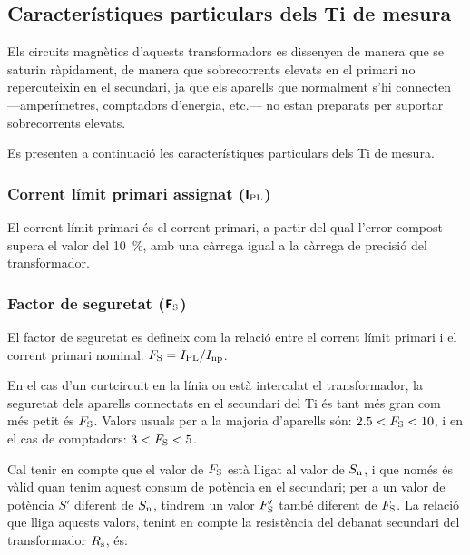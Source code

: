 \subsection{Característiques particulars dels Ti de mesura}

Els circuits magnètics d'aquests transformadors es dissenyen de
manera que se saturin ràpidament, de manera que
sobrecorrents elevats en el primari  no repercuteixin en el secundari,
ja que els aparells que normalment s'hi connecten ---amperímetres,
comptadors d'energia, etc.--- no estan preparats per suportar
sobrecorrents elevats.

Es presenten a continuació les característiques particulars dels Ti
de mesura.

\subsubsection{Corrent límit primari  assignat (${\boldsymbol{\mathsf{I_\text{PL}}}}$)}

El corrent  límit primari
és el corrent primari, a partir del qual l'error compost supera el valor del \qty{10}{\percent}, amb una càrrega igual a la càrrega de
precisió del transformador.

\subsubsection{Factor de seguretat (${\boldsymbol{\mathsf{F_\text{S}}}}$) }

 El factor de seguretat
es defineix com la relació entre el corrent límit primari
i el corrent primari nominal: $F_\mathrm{S} = I_\mathrm{PL} / I_\mathrm{np}$.

En el cas d'un curtcircuit en la línia on està intercalat el
transformador, la seguretat dels aparells connectats en el secundari
del Ti és tant més gran com més petit és  $F_\mathrm{S}$. Valors usuals
per a la majoria d'aparells són:  $\num{2,5}<F_\mathrm{S}<10$, i en el cas de comptadors: $3<F_\mathrm{S}<5$.

Cal tenir en compte que el valor de $F_\mathrm{S}$ està lligat
 al valor de $S_\mathrm{n}$, i que només és vàlid
quan tenim aquest consum de  potència en el secundari; per a un
valor de potència $S'$ diferent de $S_\mathrm{n}$, tindrem un valor
$F'_\mathrm{S}$ també diferent de  $F_\mathrm{S}$. La relació que
lliga aquests valors, tenint en compte la resistència del debanat
secundari del transformador  $R_\mathrm{s}$, és:

